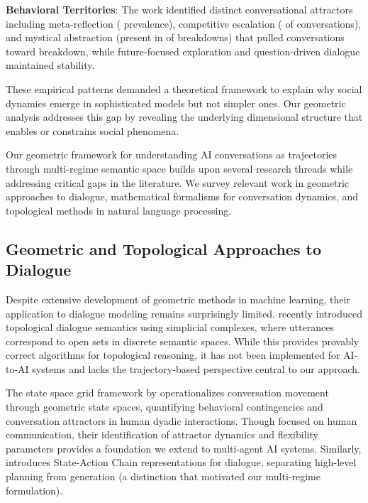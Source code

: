 \documentclass[11pt,letterpaper]{article}
\begin{document}
\textbf{Behavioral Territories}: The work identified distinct conversational attractors including meta-reflection (\metaReflectionPrevalence{} prevalence), competitive escalation (\competitiveEscalationPrevalence{} of conversations), and mystical abstraction (present in \mysticalBreakdownPrevalence{} of breakdowns) that pulled conversations toward breakdown, while future-focused exploration and question-driven dialogue maintained stability.

These empirical patterns demanded a theoretical framework to explain why social dynamics emerge in sophisticated models but not simpler ones. Our geometric analysis addresses this gap by revealing the underlying dimensional structure that enables or constrains social phenomena.

Our geometric framework for understanding AI conversations as trajectories through multi-regime semantic space builds upon several research threads while addressing critical gaps in the literature. We survey relevant work in geometric approaches to dialogue, mathematical formalisms for conversation dynamics, and topological methods in natural language processing.

\subsection{Geometric and Topological Approaches to Dialogue}

Despite extensive development of geometric methods in machine learning, their application to dialogue modeling remains surprisingly limited. \citep{ballus2024topological} recently introduced topological dialogue semantics using simplicial complexes, where utterances correspond to open sets in discrete semantic spaces. While this provides provably correct algorithms for topological reasoning, it has not been implemented for AI-to-AI systems and lacks the trajectory-based perspective central to our approach.

The state space grid framework by \citep{brinberg2024state} operationalizes conversation movement through geometric state spaces, quantifying behavioral contingencies and conversation attractors in human dyadic interactions. Though focused on human communication, their identification of attractor dynamics and flexibility parameters provides a foundation we extend to multi-agent AI systems. Similarly, \citep{sage2025steering} introduces State-Action Chain representations for dialogue, separating high-level planning from generation (a distinction that motivated our multi-regime formulation).
\end{document}
